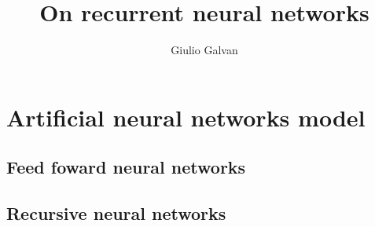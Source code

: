 \documentclass{book}
\title{On recurrent neural networks}
\author{Giulio Galvan}
\theoremstyle{definition}
\begin{document}
\maketitle
\tableofcontents
\chapter{Artificial neural networks model}

\section{Feed foward neural networks}

\section{Recursive neural networks}




\newpage
{}

\end{document}

